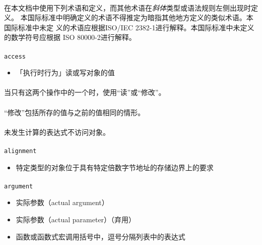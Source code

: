 
\paragraph{}
在本文档中使用下列术语和定义，而其他术语在\textit{斜体}类型或语法规则左侧出现时定义。
本国际标准中明确定义的术语不得推定为暗指其他地方定义的类似术语。本国际标准中未定
义的术语应根据ISO/IEC 2382-1进行解释。本国际标准中未定义的数学符号应根据
ISO 80000-2进行解释。


\paragraph{}
\texttt{access}
\begin{itemize}
  \item[]{「执行时行为」读或写对象的值}
\end{itemize}

\paragraph{}
\notes 当只有这两个操作中的一个时，使用``读''或``修改''。

\paragraph{}
\notes ``修改''包括所存的值与之前的值相同的情形。

\paragraph{}
\notes 未发生计算的表达式不访问对象。

\paragraph{}
\texttt{alignment}
\begin{itemize}
  \item[]{特定类型的对象位于具有特定倍数字节地址的存储边界上的要求}
\end{itemize}

\paragraph{}
\texttt{argument}
\begin{itemize}
  \item[]{实际参数（actual argument）}
  \item[]{实际参数（actual parameter）（弃用）}
  \item[]{函数或函数式宏调用括号中，逗号分隔列表中的表达式}
\end{itemize}

